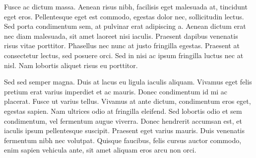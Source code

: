 \documentclass[twocolumn]{emulateapj}
\begin{document}
Fusce ac dictum massa. Aenean risus nibh, facilisis eget malesuada at, tincidunt eget eros. Pellentesque eget est commodo, egestas dolor nec, sollicitudin lectus. Sed porta condimentum sem, at pulvinar erat adipiscing a. Aenean dictum erat nec diam malesuada, sit amet laoreet nisi iaculis. Praesent dapibus venenatis risus vitae porttitor. Phasellus nec nunc at justo fringilla egestas. Praesent at consectetur lectus, sed posuere orci. Sed in nisi ac ipsum fringilla luctus nec at nisl. Nam lobortis aliquet risus eu porttitor.

Sed sed semper magna. Duis at lacus eu ligula iaculis aliquam. Vivamus eget felis pretium erat varius imperdiet et ac mauris. Donec condimentum id mi ac placerat. Fusce ut varius tellus. Vivamus at ante dictum, condimentum eros eget, egestas sapien. Nam ultrices odio at fringilla eleifend. Sed lobortis odio et sem condimentum, vel fermentum augue viverra. Donec hendrerit accumsan est, et iaculis ipsum pellentesque suscipit. Praesent eget varius mauris. Duis venenatis fermentum nibh nec volutpat. Quisque faucibus, felis cursus auctor commodo, enim sapien vehicula ante, sit amet aliquam eros arcu non orci.
\end{document}
